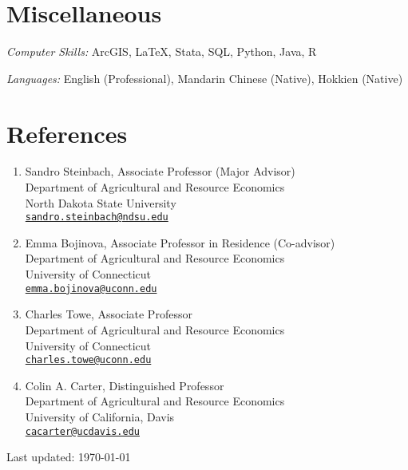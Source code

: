 \documentclass[11 pt,letterpaper]{article}
\renewenvironment{itemize}{
	\begin{list}{}{
			\setlength{\leftmargin}{1.5em}
		}
	}{
	\end{list}
}
\begin{document}
	
	
	\section*{\textbf{Miscellaneous}}
	\begin{itemize}
		\item[-] \textit{Computer Skills:} ArcGIS, \LaTeX, Stata, SQL, Python,   Java, R
		\item[-] \textit{Languages:}  English (Professional),  Mandarin Chinese (Native), Hokkien (Native)
		
	\end{itemize}
	
	
	
	
	\newpage
	
	\section*{\textbf{References}}
	
	\begin{enumerate}[leftmargin=0in]
		\item[] Sandro Steinbach, Associate Professor (Major Advisor) \\
		Department of Agricultural and Resource Economics \\
		North Dakota State University \\
				\href{mailto:sandro.steinbach@ndsu.edu}{\texttt{sandro.steinbach@ndsu.edu}}
				
		\item[] Emma Bojinova, Associate Professor in Residence (Co-advisor)\\
Department of Agricultural and Resource Economics \\
University of Connecticut \\
\href{mailto:emma.bojinova@uconn.edu}{\texttt{emma.bojinova@uconn.edu}}

		
 
 
 \item[] Charles Towe, Associate Professor \\
Department of Agricultural and Resource Economics \\
University of Connecticut \\
 \href{mailto:charles.towe@uconn.edu}{\texttt{charles.towe@uconn.edu}}
 
		

				\item[] Colin A. Carter, Distinguished Professor \\
		Department of Agricultural and Resource Economics \\
		University of California, Davis \\
				\href{mailto:cacarter@ucdavis.edu}{\texttt{cacarter@ucdavis.edu}}
		
		
	\end{enumerate}
\vfill
			
	\bigskip
	\bigskip 
	\begin{center}
		\begin{footnotesize}
		\raggedleft	Last updated: \today \\
		\end{footnotesize}
	\end{center}
	
\end{document}
